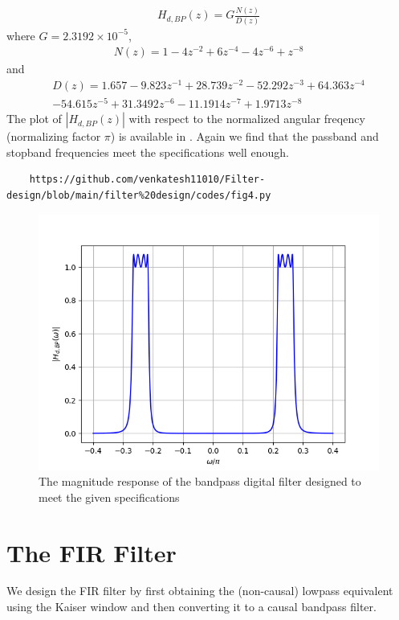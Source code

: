\documentclass{article}
\begin{document}
\begin{eqnarray}
H_{d,BP}(z) = G \frac{N(z)}{D(z)}
\end{eqnarray}
where $G = 2.3192 \times 10^{-5}$,
\begin{eqnarray}
N(z)=  1 - 4 z^{-2} + 6 z^{-4} - 4z^{-6} + z^{-8} 
\end{eqnarray}
and
\begin{eqnarray}
D(z) = 1.657 -9.823z^{-1} + 28.739z^{-2}  -52.292z^{-3}+  64.363z^{-4}\nonumber \\
  -54.615z^{-5}+   31.3492z^{-6}  -11.1914z^{-7} +   1.9713z^{-8}
\end{eqnarray}
The plot of $|H_{d,BP}(z)|$ with respect to the normalized angular freqency (normalizing factor $\pi$) is available in .  Again we
find that the passband and stopband frequencies meet the specifications well enough.
\begin{lstlisting}
	https://github.com/venkatesh11010/Filter-design/blob/main/filter%20design/codes/fig4.py
\end{lstlisting}
\begin{figure}[H]
\includegraphics[width = \columnwidth]{figs/fig4.png}
\caption{The magnitude response of the bandpass digital filter designed to meet the given specifications} 
\label{fig5}
\end{figure}

\section{The FIR Filter}
We design the FIR filter by first obtaining the (non-causal) lowpass equivalent using the Kaiser window
and then
converting it to a causal bandpass filter.
\end{document}
